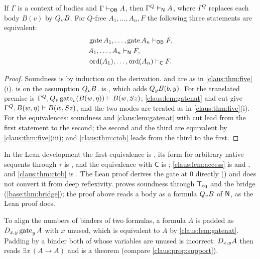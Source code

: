 \begin{theorem}
\label{claus:thm:onebody}
If $\Gamma$ is a context of bodies and $\Gamma\vdash_{\mathsf{OB}}A$, then
$\Gamma^{Q}\vdash_{\mathsf{N}}A$, where $\Gamma^{Q}$ replaces each body $B(v)$
by $Q_{v}B$. For $Q$-free $A_1,\dots,A_n,F$ the following three statements
are equivalent:
\begin{align*}
 &\operatorname{gate}A_1,\dots,\operatorname{gate}A_n
   \vdash_{\mathsf{OB}}F,\\
 &A_1,\dots,A_n\vdash_{\mathsf{N}}F,\\
 &\operatorname{ord}(A_1),\dots,\operatorname{ord}(A_n)
   \vdash_{\mathsf{C}}F .
\end{align*}
\end{theorem}
\begin{proof}
Soundness is by induction on the derivation.  and
 are as in \cref{claus:thm:five}(i).  is 
on the assumption $Q_{v}B$.  is , which adds
$Q_{y}B(b,y)$. For  the translated premise is
$\Gamma^{Q},Q_{v}\operatorname{gate}_v(B(w,\eta))\vdash B(w,S z)$;
\cref{claus:lem:gatenat} and cut give
$\Gamma^{Q},B(w,\eta)\vdash B(w,S z)$, and the two modes are treated
as in \cref{claus:thm:five}(i). For the equivalences: soundness and
\cref{claus:lem:gatenat} with cut lead from the first statement to the
second; the second and the third are equivalent by
\cref{claus:thm:five}(iii); and \cref{claus:thm:ctob} leads from the third
to the first.
\end{proof}

\begin{remark}
\label{claus:rem:obpkgs}
In the Lean development the first
equivalence is , its form for arbitrary native
sequents through $\tau$ is , and the
equivalence with $\mathsf{C}$ is ;
\cref{claus:lem:access} is  and
, and \cref{claus:thm:ctob} is . The Lean
proof derives the gate at $0$ directly () and does not
convert it from deep reflexivity.  proves soundness through
$\mathsf{T}_{\mathrm{eq}}$ and the bridge (\cref{base:thm:bridge}); the proof above reads a
body as a formula $Q_{v}B$ of $\mathsf{N}$, as the Lean proof does.
\end{remark}

\begin{remark}
\label{claus:rem:padding}
To align the numbers of binders of two formulas, a formula $A$ is padded
as $D_{x,y}\operatorname{gate}_yA$ with $x$ unused, which is equivalent
to $A$ by \cref{claus:lem:gatenat}. Padding by a binder both of whose
variables are unused is incorrect: $D_{x,y}A$ then reads
$\exists x\,(A\to A)$ and is a theorem
(compare \cref{claus:prop:support}).
\end{remark}

